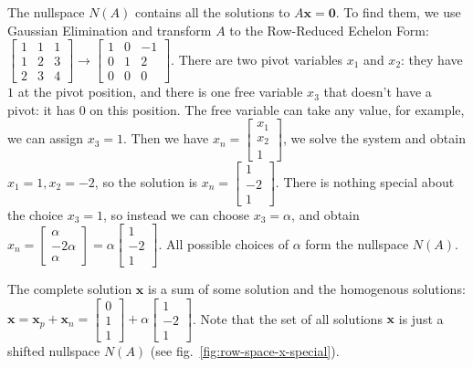 \documentclass{acm_proc_article-sp}
\begin{document}
The nullspace \(N(A)\) contains all the solutions to
\(A \mathbf x = \mathbf 0\). To find them, we use Gaussian Elimination and transform \(A\) to the Row-Reduced Echelon Form:
\(\begin{bmatrix} 1 & 1 & 1 \\ 1 & 2 & 3 \\ 2 & 3 & 4 \end{bmatrix} \to \begin{bmatrix} 1 & 0 & -1 \\ 0 & 1 & 2 \\ 0 & 0 & 0 \end{bmatrix}\).
There are two pivot variables \(x_1\) and \(x_2\): they have \(1\) at the
pivot position, and there is one free variable \(x_3\) that doesn't have a pivot: it has
\(0\) on this position.
The free variable can take any value, for example, we can assign \(x_3 = 1\).
Then we have \(x_n = \begin{bmatrix} x_1 \\ x_2 \\ 1 \end{bmatrix}\),
we solve the system and obtain \(x_1 = 1, x_2 = -2\), so the solution is \(x_n = \begin{bmatrix} 1 \\ -2 \\ 1 \end{bmatrix}\).
There is nothing special about the choice \(x_3 = 1\), so instead we
can choose \(x_3 = \alpha\), and obtain \(x_n = \begin{bmatrix} \alpha \\ -2 \alpha \\ \alpha
\end{bmatrix} = \alpha \begin{bmatrix} 1 \\ -2 \\ 1 \end{bmatrix}\). All possible choices of $\alpha$ form the nullspace \(N(A)\).


The complete solution $\mathbf x$ is a sum of some solution and the homogenous solutions:
\(\mathbf x = \mathbf x_p + \mathbf x_n = \begin{bmatrix} 0 \\ 1 \\ 1 \end{bmatrix} + \alpha
\begin{bmatrix} 1 \\ -2 \\ 1 \end{bmatrix}\). Note that the set of all solutions $\mathbf x$ is
just a shifted nullspace $N(A)$ (see fig.~\ref{fig:row-space-x-special}).
\end{document}
